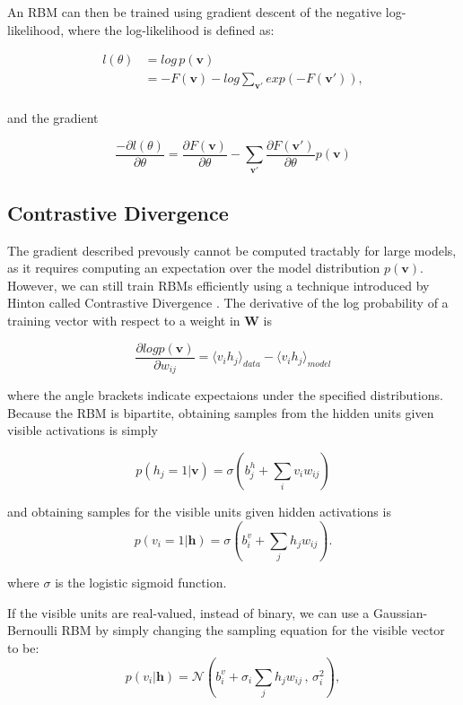 \documentclass{article}
\begin{document}
An RBM can then be trained using gradient descent of the negative
log-likelihood, where the log-likelihood is defined as:

\begin{align*}
  l(\theta) &= log \, p(\mathbf{v}) \\
            &= -F(\mathbf{v}) - log \sum_{\mathbf{v'}} exp (-F(\mathbf{v'})), \\
\end{align*}

and the gradient

\[
  \frac{- \partial l(\theta)}{\partial \theta}
  = \frac{\partial F(\mathbf{v})}{\partial \theta} - 
  \sum_{\mathbf{v'}}\frac{\partial F(\mathbf{v'})}{\partial \theta}
                  p(\mathbf{v})
\]


\subsection{Contrastive Divergence}

The gradient described prevously cannot be computed tractably for large models,
as it requires computing an expectation over the model distribution
$p(\mathbf{v})$.  However, we can still train RBMs efficiently using a
technique introduced by Hinton called Contrastive Divergence
\cite{hinton_contrastivedivergence}. The derivative of the log probability of a
training vector with respect to a weight in $\mathbf{W}$ is 

\[
  \frac{\partial log p(\mathbf{v})}{\partial w_{ij}} = 
  \langle v_i h_j \rangle_{data} - \langle v_i h_j \rangle_{model}
\]

where the angle brackets indicate expectaions under the specified distributions.
Because the RBM is bipartite, obtaining samples from the hidden units given
visible activations is simply

\[
  p (h_j = 1 | \mathbf{v}) = \sigma(b_{j}^{h} + \sum_i v_{i} w_{ij})
\]

and obtaining samples for the visible units given hidden activations is
\[
  p (v_i = 1 | \mathbf{h}) = \sigma(b_{i}^{v} + \sum_j h_j w_{ij}).
\]

where $\sigma$ is the logistic sigmoid function.

If the visible units are real-valued, instead of binary, we can use a
Gaussian-Bernoulli RBM by simply changing the sampling equation for the visible
vector to be:
\[
  p (v_i | \mathbf{h}) = \mathcal{N} \left( b_{i}^{v} +
    \sigma_i \sum_j h_j w_{ij} \,,\, \sigma_i^2 \right),
\]
\end{document}

